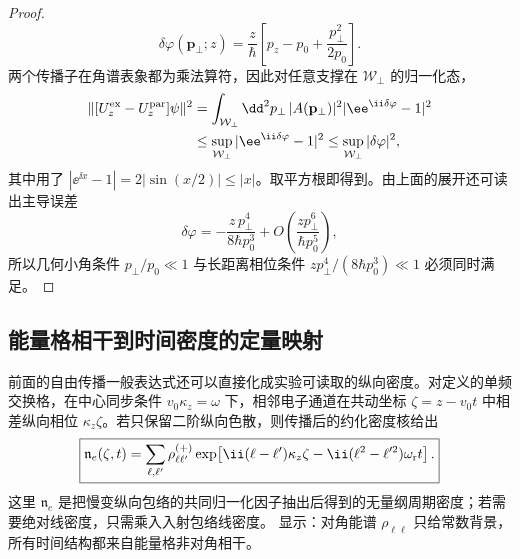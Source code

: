 \begin{proof}
\begin{equation*}
\delta\varphi(\mathbf p_\perp;z)
=\frac{z}{\hbar}
\left[p_z-p_0+\frac{p_\perp^2}{2p_0}\right].
\end{equation*}
两个传播子在角谱表象都为乘法算符，因此对任意支撑在 $\mathcal W_\perp$ 的归一化态，
\begin{align*}
\|[U_z^{\rm ex}-U_z^{\rm par}]\psi\|^2
&=\int_{\mathcal W_\perp}\dd^2 p_\perp\,
|A(\mathbf p_\perp)|^2
|\ee^{\ii\delta\varphi}-1|^2\\
&\le \sup_{\mathcal W_\perp}|\ee^{\ii\delta\varphi}-1|^2
\le \sup_{\mathcal W_\perp}|\delta\varphi|^2,
\end{align*}
其中用了 $|\ee^{\ii x}-1|=2|\sin(x/2)|\le|x|$。取平方根即得到。由上面的展开还可读出主导误差
\begin{equation*}
\delta\varphi
=-\frac{z\,p_\perp^4}{8\hbar p_0^3}
+O\!\left(\frac{z p_\perp^6}{\hbar p_0^5}\right),
\end{equation*}
所以几何小角条件 $p_\perp/p_0\ll1$ 与长距离相位条件 $z p_\perp^4/(8\hbar p_0^3)\ll1$ 必须同时满足。
\end{proof}


\subsection{能量格相干到时间密度的定量映射}\label{subsec:sideband-to-temporal-density-dp46}



前面的自由传播一般表达式还可以直接化成实验可读取的纵向密度。对定义的单频交换格，在中心同步条件 $v_0\kappa_z=\omega$ 下，相邻电子通道在共动坐标 $\zeta=z-v_0t$ 中相差纵向相位 $\kappa_z\zeta$。若只保留二阶纵向色散，则传播后的约化密度核给出
\begin{equation}
\boxed{
 \mathfrak n_e(\zeta,t)
 =\sum_{\ell,\ell'}
 \rho_{\ell\ell'}^{(+)}
 \exp\!\left[\ii(\ell-\ell')\kappa_z\zeta
 -\ii(\ell^2-\ell'^2)\omega_{\rm r}t\right].}
\label{eq:sideband_to_longitudinal_density_dp46}
\end{equation}
这里 $\mathfrak n_e$ 是把慢变纵向包络的共同归一化因子抽出后得到的无量纲周期密度；若需要绝对线密度，只需乘入入射包络线密度。 显示：对角能谱 $\rho_{\ell\ell}$ 只给常数背景，所有时间结构都来自能量格非对角相干。

